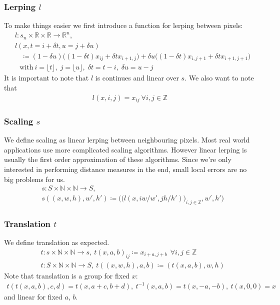 \documentclass{article}
\begin{document}
\subsubsection{Lerping $l$}
To make things easier we first introduce a function for lerping between pixels:
\begin{align}
&l : s_n\times\mathbb R\times\mathbb R \to \mathbb R^n,\nonumber\\
&l(x, t=i+\delta t, u=j+\delta u) \nonumber\\
&\ \ \ \ \coloneqq (1-\delta u)\big( (1-\delta t)x_{ij} + \delta t x_{i+1,j} \big) + \delta u\big( (1-\delta t)x_{i,j+1} + \delta t x_{i+1,j+1} \big)\\
&\ \ \ \text{with}\ i = \lfloor t\rfloor,\; j = \lfloor u\rfloor,\; \delta t = t - i,\; \delta u = u - j\nonumber
\end{align}
It is important to note that $l$ is continues and linear over $s$. We also want to note that
\begin{align*}
l(x,i,j) = x_{ij}\ \forall i,j\in \mathbb Z
\end{align*}

\subsubsection{Scaling $s$}
We define scaling as linear lerping between neighbouring pixels. Most real world applications use more complicated scaling algorithms. However linear lerping is usually the first order approximation of these algorithms. Since we're only interested in performing distance measures in the end, small local errors are no big problems for us.
\begin{align}
&s : S\times\mathbb N\times\mathbb N \to S,\nonumber\\
&s((x,w,h), w', h') \coloneqq \big(\big(l(x, i w/w', j h/h')\big)_{i,j \in \mathbb Z}, w', h'\big)
\end{align}

\subsubsection{Translation $t$}
We define translation as expected.
\begin{align}
&t : s\times\mathbb N\times\mathbb N \to s,\ t(x, a, b)_{ij} \coloneqq x_{i+a,j+b}\ \ \forall i,j \in \mathbb Z \nonumber\\
&t : S\times\mathbb N\times\mathbb N \to S,\ t((x,w,h), a, b) \coloneqq (t(x, a, b), w, h)
\end{align}
Note that translation is a group for fixed $x$:
\begin{align}
t(t(x, a, b), c, d) = t(x, a+c, b+d),\ t^{-1}(x, a, b) = t(x, -a, -b),\ t(x, 0, 0) = x\nonumber
\end{align}
and linear for fixed $a$, $b$.
\end{document}
